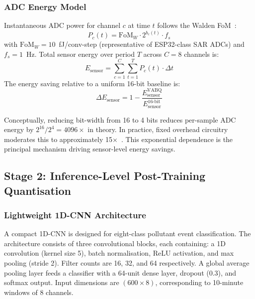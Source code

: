\subsubsection{ADC Energy Model}

Instantaneous ADC power for channel $c$ at time $t$ follows the Walden FoM~\cite{andrulis2024adc, waldenADC2018}:
\begin{equation}
    P_c(t) = \text{FoM}_W \cdot 2^{b_c(t)} \cdot f_s
    \label{eq:adcpower}
\end{equation}
with $\text{FoM}_W = 10$~fJ/conv-step (representative of ESP32-class SAR ADCs) and $f_s = 1$~Hz. Total sensor energy over period $T$ across $C = 8$ channels is:
\begin{equation}
    E_{\text{sensor}} = \sum_{c=1}^{C} \sum_{t=1}^{T} P_c(t) \cdot \Delta t
    \label{eq:sensorenergy}
\end{equation}
The energy saving relative to a uniform 16-bit baseline is:
\begin{equation}
    \Delta E_{\text{sensor}} = 1 - \frac{E_{\text{sensor}}^{\text{VABQ}}}{E_{\text{sensor}}^{\text{16-bit}}}
    \label{eq:sensorsaving}
\end{equation}

Conceptually, reducing bit-width from 16 to 4 bits reduces per-sample ADC energy by $2^{16}/2^4 = 4096\times$ in theory. In practice, fixed overhead circuitry moderates this to approximately 15$\times$~\cite{andrulis2024adc, reconfigADC2025}. This exponential dependence is the principal mechanism driving sensor-level energy savings.

\subsection{Stage 2: Inference-Level Post-Training Quantisation}
\label{sec:meth_stage2}

\subsubsection{Lightweight 1D-CNN Architecture}

A compact 1D-CNN is designed for eight-class pollutant event classification. The architecture consists of three convolutional blocks, each containing: a 1D convolution (kernel size 5), batch normalisation, ReLU activation, and max pooling (stride 2). Filter counts are 16, 32, and 64 respectively. A global average pooling layer feeds a classifier with a 64-unit dense layer, dropout (0.3), and softmax output. Input dimensions are $(600 \times 8)$, corresponding to 10-minute windows of 8 channels.

